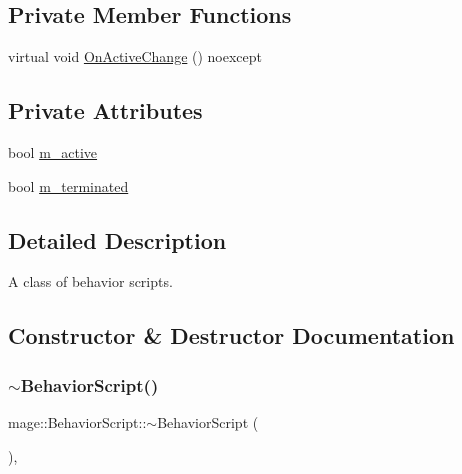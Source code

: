 \subsection*{Private Member Functions}
\begin{DoxyCompactItemize}
\item 
virtual void \hyperlink{classmage_1_1_behavior_script_a17703fd980599ccf7265b5ffc6148fe8}{On\+Active\+Change} () noexcept
\end{DoxyCompactItemize}
\subsection*{Private Attributes}
\begin{DoxyCompactItemize}
\item 
bool \hyperlink{classmage_1_1_behavior_script_a18f81792aed31a2d61a8a75784e2ceef}{m\+\_\+active}
\item 
bool \hyperlink{classmage_1_1_behavior_script_abc4a0e6728787347012404a597ab8e07}{m\+\_\+terminated}
\end{DoxyCompactItemize}


\subsection{Detailed Description}
A class of behavior scripts. 

\subsection{Constructor \& Destructor Documentation}
\hypertarget{classmage_1_1_behavior_script_a61e4825ba0fc7746d49faa44ed7bc481}{}\label{classmage_1_1_behavior_script_a61e4825ba0fc7746d49faa44ed7bc481} 
\subsubsection{\texorpdfstring{$\sim$\+Behavior\+Script()}{~BehaviorScript()}}
{\footnotesize\ttfamily mage\+::\+Behavior\+Script\+::$\sim$\+Behavior\+Script (\begin{DoxyParamCaption}{ }\end{DoxyParamCaption})\hspace{0.3cm}{\ttfamily [virtual]}, {\ttfamily [default]}}

